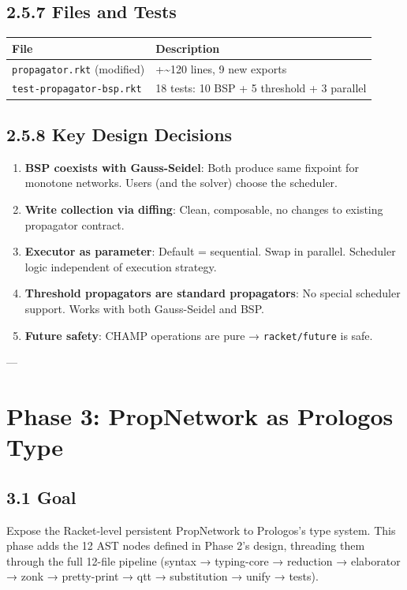 \documentclass[11pt]{article}
\begin{document}
\subsection{2.5.7 Files and Tests}
\label{sec:orgb765ed9}

\begin{center}
\begin{tabular}{ll}
File & Description\\
\hline
\texttt{propagator.rkt} (modified) & +\textasciitilde{}120 lines, 9 new exports\\
\texttt{test-propagator-bsp.rkt} & 18 tests: 10 BSP + 5 threshold + 3 parallel\\
\end{tabular}
\end{center}
\subsection{2.5.8 Key Design Decisions}
\label{sec:org4492093}

\begin{enumerate}
\item \textbf{BSP coexists with Gauss-Seidel}: Both produce same fixpoint for
monotone networks. Users (and the solver) choose the scheduler.
\item \textbf{Write collection via diffing}: Clean, composable, no changes to
existing propagator contract.
\item \textbf{Executor as parameter}: Default = sequential. Swap in parallel.
Scheduler logic independent of execution strategy.
\item \textbf{Threshold propagators are standard propagators}: No special scheduler
support. Works with both Gauss-Seidel and BSP.
\item \textbf{Future safety}: CHAMP operations are pure → \texttt{racket/future} is safe.
\end{enumerate}

---
\section{Phase 3: PropNetwork as Prologos Type}
\label{sec:orgd2b4b05}

\subsection{3.1 Goal}
\label{sec:orga3caedd}

Expose the Racket-level persistent PropNetwork to Prologos's type system.
This phase adds the 12 AST nodes defined in Phase 2's design, threading
them through the full 12-file pipeline (syntax → typing-core → reduction →
elaborator → zonk → pretty-print → qtt → substitution → unify → tests).
\end{document}
